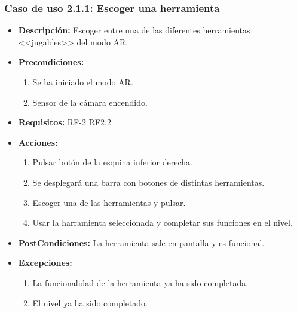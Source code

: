 \subsubsection{Caso de uso 2.1.1: Escoger una herramienta}
\begin{itemize}
	\item \textbf{Descripción:} Escoger entre una de las diferentes herramientas <<jugables>> del modo AR.
	\item \textbf{Precondiciones:}
	\begin{enumerate}
		\item Se ha iniciado el modo AR.
		\item Sensor de la cámara encendido.
	\end{enumerate}
	\item \textbf{Requisitos:}  RF-2 RF2.2
	\item \textbf{Acciones:} 
	\begin{enumerate}
		\item Pulsar  botón de la esquina inferior derecha.
		\item Se desplegará una barra con botones de distintas herramientas.
		\item Escoger una de las herramientas y pulsar.
		\item Usar la harramienta seleccionada y completar sus funciones en el nivel.
	\end{enumerate}
	\item \textbf{PostCondiciones:} La herramienta sale en pantalla y es funcional.
	\item \textbf{Excepciones:} 
	\begin{enumerate}
		\item La funcionalidad de la herramienta ya ha sido completada.
		\item El nivel ya ha sido completado.
	\end{enumerate}

\end{itemize}
